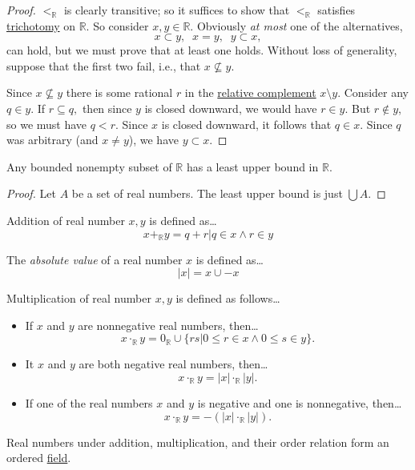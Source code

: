 \begin{proof}
$<_{\mathbb{R}}$ is clearly transitive; so it suffices to show that $<_{\mathbb{R}}$ satisfies \hyperref[trichotomy]{trichotomy} on $\mathbb{R}$. So consider $x,y \in \mathbb{R}$. Obviously \emph{at most} one 
of the alternatives,
$$x \subset y, \; \; x = y, \; \; y \subset x,$$
can hold, but we must prove that at least one holds. Without loss of generality, suppose that the first two fail, i.e., that $x \not \subseteq y.$

Since $x \not \subseteq y$ there is some rational $r$ in the \hyperref[complement]{relative complement} $x \setminus y$. Consider any $q \in y.$ If $r \subseteq q,$ then since $y$ is closed downward, we would 
have $r \in y.$ But $r \not \in y$, so we must have $q < r$. Since $x$ is closed downward, it follows that $q \in x$. Since $q$ was arbitrary (and $x \neq y$), we have $y \subset x$.
\end{proof}

\begin{theorem}\label{leastupperbound}
Any bounded nonempty subset of $\mathbb{R}$ has a least upper bound in $\mathbb{R}$.
\end{theorem}

\begin{proof}
Let $A$ be a set of real numbers. The least upper bound is just $\bigcup A$.
\end{proof}

Addition of real number $x,y$ is defined as\dots
$$x +_{\mathbb{R}} y = {q + r | q \in x \land r \in y}$$

The \emph{absolute value}\label{absolutevalue} of a real number $x$ is defined as\dots
$$|x| = x \cup -x$$

\noindent Multiplication of real number $x,y$ is defined as follows\dots
\begin{itemize}
  \item If $x$ and $y$ are nonnegative real numbers, then\dots
 		$$x \cdot_{\mathbb{R}} y = 0_{\mathbb{R}} \cup \{ rs | 0 \leq r \in x \land 0 \leq s \in y \}.$$
  \item It $x$ and $y$ are both negative real numbers, then\dots
  	    $$x \cdot_{\mathbb{R}} y = |x| \cdot_{\mathbb{R}} |y|.$$
  \item If one of the real numbers $x$ and $y$ is negative and one is nonnegative, then\dots
  		$$x \cdot_{\mathbb{R}} y = -(|x| \cdot_{\mathbb{R}} |y|).$$
\end{itemize}

\noindent Real numbers under addition, multiplication, and their order relation form an ordered \hyperref[ringtheory]{field}.